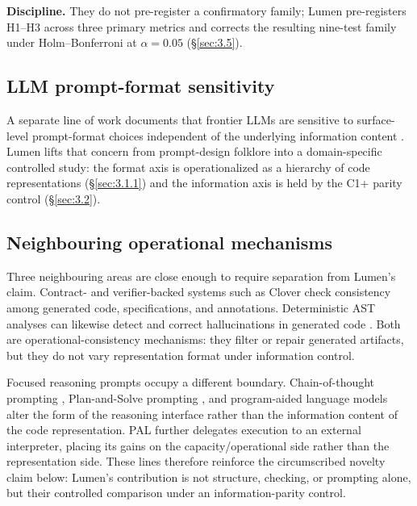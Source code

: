 \documentclass[11pt]{article}
\begin{document}
\textbf{Discipline.} They do not pre-register a confirmatory
family; Lumen pre-registers H1--H3 across three primary metrics
and corrects the resulting nine-test family under
Holm--Bonferroni at $\alpha = 0.05$ (\S\ref{sec:3.5}).

\subsection{LLM prompt-format sensitivity}
\label{sec:2.3}
A separate line of work documents that frontier LLMs are
sensitive to surface-level prompt-format choices independent of
the underlying information content
\citep{sclar2024formatsensitivity, salinas2024butterfly}. Lumen
lifts that concern from prompt-design folklore into a
domain-specific controlled study: the format axis is
operationalized as a hierarchy of code representations
(\S\ref{sec:3.1.1}) and the information axis is held by the C1+
parity control (\S\ref{sec:3.2}).

\subsection{Neighbouring operational mechanisms}
\label{sec:2.4-neighbours}
Three neighbouring areas are close enough to require separation
from Lumen's claim. Contract- and verifier-backed systems such as
Clover \citep{sun2024clover} check consistency among generated
code, specifications, and annotations. Deterministic AST analyses
can likewise detect and correct hallucinations in generated code
\citep{khati2026asthallucination}. Both are operational-consistency
mechanisms: they filter or repair generated artifacts, but they do
not vary representation format under information control.

Focused reasoning prompts occupy a different boundary. Chain-of-thought
prompting \citep{wei2022cot}, Plan-and-Solve prompting
\citep{wang2023plansolve}, and program-aided language models
\citep{gao2023pal} alter the form of the reasoning interface rather
than the information content of the code representation. PAL further
delegates execution to an external interpreter, placing its gains on
the capacity/operational side rather than the representation side.
These lines therefore reinforce the circumscribed novelty claim
below: Lumen's contribution is not structure, checking, or prompting
alone, but their controlled comparison under an information-parity
control.
\end{document}
